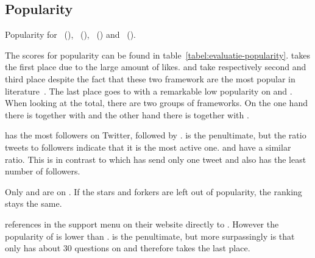 \documentclass[a4paper]{artikel3}
\begin{document}
\subsection{Popularity} %
\label{sec:evaluation-popularity}

\begin{table}[t]
\centering
\resizebox{\columnwidth}{!} {
}
\caption{Popularity for \st{}~(\sta), \kendo{}~(\kendoa), \jqm{}~(\jqma) and \lungo{}~(\lungoa).}
\label{tabel:evaluatie-popularity}
\end{table}

The scores for popularity can be found in table~\ref{tabel:evaluatie-popularity}. 
\kendob{} takes the first place due to the large amount of \fb{} likes.
\jqma{} and \sta{} take respectively second and third place despite the fact that these two framework are the most popular in literature~\cite{David2011,Firtman2013,Hales2012,Oeflman2011}. 
The last place goes to \lungo{} with a remarkable low popularity on \so{} and \fb.
When looking at the total, there are two groups of frameworks.
On the one hand there is \kendob{} together with \jqma{} and the other hand there is \sta{} together with \lungo{}.

\jqma{} has the most followers on Twitter, followed by \kendob.
\lungo{} is the penultimate, but the ratio tweets to followers indicate that it is the most active one. 
\jqma{} and \kendob{} have a similar ratio.
This is in contrast to \sta{} which has send only one tweet and also has the least number of followers. 

Only \jqma{} and \lungo{} are on \gh{}. 
If the \gh{} stars and \gh{} forkers are left out of popularity, the ranking stays the same.

\kendob{} references in the support menu on their website directly to \so{}. 
However the popularity of \kendob{} is lower than \jqma{}.
\sta{} is the penultimate, but more surpassingly is that \lungo{} only has about 30 questions on \so{} and therefore takes the last place.
\end{document}
